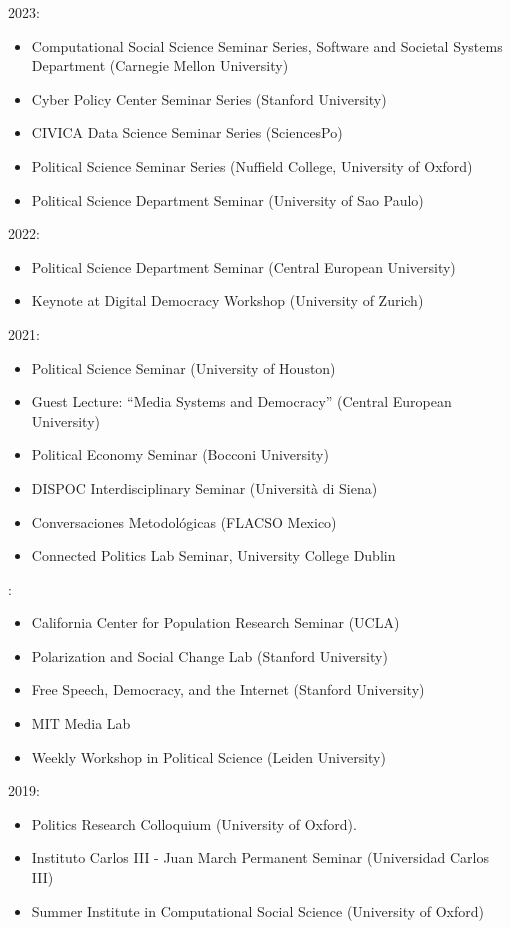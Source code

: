 \documentclass[margin,line,11pt]{resume}
\begin{document}
\begin{resume}
2023:
\begin{itemize}
\item Computational Social Science Seminar Series, Software and Societal Systems Department (Carnegie Mellon University)
\item Cyber Policy Center Seminar Series (Stanford University)
\item CIVICA Data Science Seminar Series (SciencesPo)
\item Political Science Seminar Series (Nuffield College, University of Oxford)
\item Political Science Department Seminar (University of Sao Paulo)
\end{itemize}

2022:
\begin{itemize}
\item Political Science Department Seminar (Central European University)
\item Keynote at Digital Democracy Workshop (University of Zurich)
\end{itemize}

2021:
\begin{itemize}
\item Political Science Seminar (University of Houston)
\item Guest Lecture: ``Media Systems and Democracy'' (Central European University)
\item Political Economy Seminar (Bocconi University)
\item DISPOC Interdisciplinary Seminar (Universit\`{a} di Siena)
\item Conversaciones Metodol\'{o}gicas (FLACSO Mexico)
\item Connected Politics Lab Seminar, University College Dublin
\end{itemize}
:
\begin{itemize}
\item California Center for Population Research Seminar (UCLA)
\item Polarization and Social Change Lab (Stanford University)
\item Free Speech, Democracy, and the Internet (Stanford University)
\item MIT Media Lab
\item Weekly Workshop in Political Science (Leiden University)
\end{itemize}    

2019: 
\begin{itemize} 
\item Politics Research Colloquium (University of Oxford).
\item Instituto Carlos III - Juan March Permanent Seminar (Universidad Carlos III)
\item Summer Institute in Computational Social Science (University of Oxford)
\end{itemize}



\end{resume}
\end{document}

